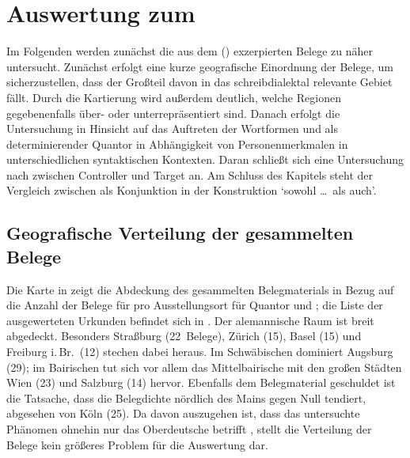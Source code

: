 \chapter{Auswertung zum }
\label{ch:caoanalyse}

Im Folgenden werden zunächst die aus dem  (\CAO) exzerpierten Belege zu  näher untersucht.
Zunächst erfolgt eine kurze geografische Einordnung der
Belege, um sicherzustellen, dass der Großteil davon in das schreib\-dialektal
relevante Gebiet fällt. Durch die Kartierung wird außerdem deutlich, welche
Regionen gegebenenfalls über- oder unter\-repräsentiert sind. Danach erfolgt
die Untersuchung in Hinsicht auf das Auftreten der Wortformen  und
 als determinierender Quantor in Abhängigkeit
von Personenmerkmalen in unterschiedlichen syntaktischen
Kontexten. Daran schließt sich eine Untersuchung nach  zwischen
Controller und Target an. Am Schluss des Kapitels steht der Vergleich zwischen
 als Konjunk\-tion in der Konstruktion 
`sowohl \dots\ als auch'.

\section{Geografische Verteilung der gesammelten Belege}

Die Karte in  zeigt die Abdeckung des gesammelten
Belegmaterials in Bezug auf die Anzahl der Belege für  pro
Ausstellungsort für Quantor und ; die Liste der ausgewerteten
Urkunden befindet sich in . Der
alemannische Raum ist breit abgedeckt.
Besonders Straßburg (22~Belege), Zürich (15), Basel (15) und Freiburg i.\,Br.\
(12) stechen dabei heraus. Im Schwäbischen dominiert Augsburg
(29); im Bairischen tut sich vor allem das
Mittelbairische\il{Bairisch} mit den großen Städten Wien (23) und Salzburg (14)
hervor. Ebenfalls dem Belegmaterial geschuldet ist die Tatsache, dass die
Belegdichte nördlich des Mains gegen Null tendiert, abgesehen von Köln (25). Da
davon auszugehen ist, dass das untersuchte Phänomen ohnehin nur das
Oberdeutsche\il{Oberdeutsch} betrifft \autocite[181--184]{ksw2}, stellt die
Verteilung der Belege kein größeres Problem für die Auswertung dar.

